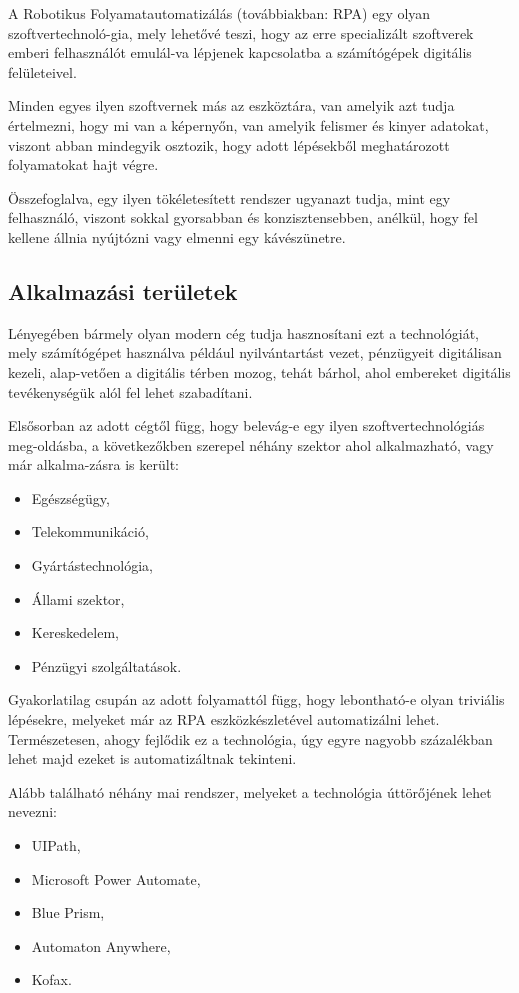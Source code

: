 
A Robotikus Folyamatautomatizálás (továbbiakban: RPA) egy olyan szoftvertechnoló\hyp{}gia, mely lehetővé teszi, hogy az erre specializált szoftverek emberi felhasználót emulál\hyp{}va lépjenek kapcsolatba a számítógépek digitális felületeivel.

Minden egyes ilyen szoftvernek más az eszköztára, van amelyik azt tudja értelmezni, hogy mi van a képernyőn, van amelyik felismer és kinyer adatokat, viszont abban mindegyik osztozik, hogy adott lépésekből meghatározott folyamatokat hajt végre.

Összefoglalva, egy ilyen tökéletesített rendszer ugyanazt tudja, mint egy felhasználó, viszont sokkal gyorsabban és konzisztensebben, anélkül, hogy fel kellene állnia nyújtózni vagy elmenni egy kávészünetre.

\subsection{Alkalmazási területek}

Lényegében bármely olyan modern cég tudja hasznosítani ezt a technológiát, mely számítógépet használva például nyilvántartást vezet, pénzügyeit digitálisan kezeli, alap\hyp{}vetően a digitális térben mozog, tehát bárhol, ahol embereket digitális tevékenységük alól fel lehet szabadítani.

Elsősorban az adott cégtől függ, hogy belevág-e egy ilyen szoftvertechnológiás meg\hyp{}oldásba, a következőkben szerepel néhány szektor ahol alkalmazható, vagy már alkalma\hyp{}zásra is került:
\begin{itemize}
	\item Egészségügy,
	\item Telekommunikáció,
	\item Gyártástechnológia,
	\item Állami szektor,
	\item Kereskedelem,
	\item Pénzügyi szolgáltatások.
\end{itemize}

Gyakorlatilag csupán az adott folyamattól függ, hogy lebontható-e olyan triviális lépésekre, melyeket már az RPA eszközkészletével automatizálni lehet. Természetesen, ahogy fejlődik ez a technológia, úgy egyre nagyobb százalékban lehet majd ezeket is automatizáltnak tekinteni.

Alább található néhány mai rendszer, melyeket a technológia úttörőjének lehet nevezni:
\begin{itemize}
	\item UIPath\cite{rpa:uipath},
	\item Microsoft Power Automate\cite{rpa:microsoftpowerautomate},
	\item Blue Prism\cite{rpa:blueprism},
	\item Automaton Anywhere\cite{rpa:automationanywhere},
	\item Kofax\cite{rpa:kofax}.
\end{itemize}

